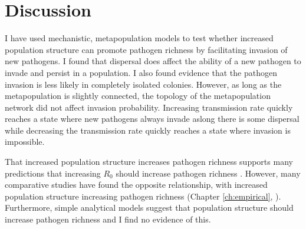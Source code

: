 

\section{Discussion}\label{s:sims1Disc}



I have used mechanistic, metapopulation models to test whether increased population structure can promote pathogen richness by facilitating invasion of new pathogens.
I found that dispersal does affect the ability of a new pathogen to invade and persist in a population.
I also found evidence that the pathogen invasion is less likely in completely isolated colonies.
However, as long as the metapopulation is slightly connected, the topology of the metapopulation network did not affect invasion probability.
Increasing transmission rate quickly reaches a state where new pathogens always invade aslong there is some dispersal while decreasing the transmission rate quickly reaches a state where invasion is impossible.

That increased population structure increases pathogen richness supports many predictions that increasing $R_0$ should increase pathogen richness \cite{nunn2003comparative, morand2000wormy, poulin2014parasite, poulin2000diversity, altizer2003social}.
However, many comparative studies have found the opposite relationship, with increased population structure increasing pathogen richness (Chapter \ref{ch:empirical}, \cites{vitone2004body, maganga2014bat, turmelle2009correlates}).
Furthermore, simple analytical models suggest that population structure should increase pathogen richness \cite{qiu2013vector, allen2004sis, nunes2006localized} and I find no evidence of this.



